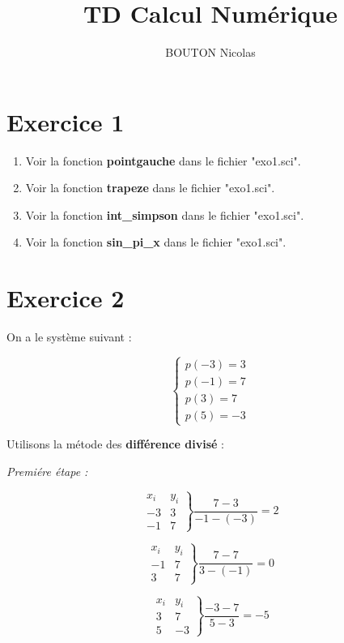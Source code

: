 \documentclass[12pt, letterpaper]{article}
\title{TD Calcul Numérique}
\author{BOUTON Nicolas}
\begin{document}
\maketitle

\section*{Exercice 1}

\begin{enumerate}
\item Voir la fonction \textbf{pointgauche} dans le fichier "exo1.sci".
\item Voir la fonction \textbf{trapeze} dans le fichier "exo1.sci".
\item Voir la fonction \textbf{int\_simpson} dans le fichier "exo1.sci".
\item Voir la fonction \textbf{sin\_pi\_x} dans le fichier "exo1.sci".
\end{enumerate}

\section*{Exercice 2}

On a le système suivant :

$$
\left\{
\begin{array}{l}
  p(-3) = 3 \\
  p(-1) = 7 \\
  p(3) = 7 \\
  p(5) = -3
\end{array}
\right.
$$

Utilisons la métode des \textbf{différence divisé} :

\textit{Premiére étape :}

$$
\left.
\begin{array}{ll}
  x_i & y_i \\
  -3 & 3 \\
  -1 & 7
\end{array}
\right\}
\frac{7 - 3}{-1 - (-3)} = 2
$$

$$
\left.
\begin{array}{ll}
  x_i & y_i \\
  -1 & 7 \\
  3 & 7
\end{array}
\right\}
\frac{7 - 7}{3 - (-1)} = 0
$$

$$
\left.
\begin{array}{ll}
  x_i & y_i \\
  3 & 7 \\
  5 & -3
\end{array}
\right\}
\frac{-3 - 7}{5 - 3} = -5
$$
\end{document}
